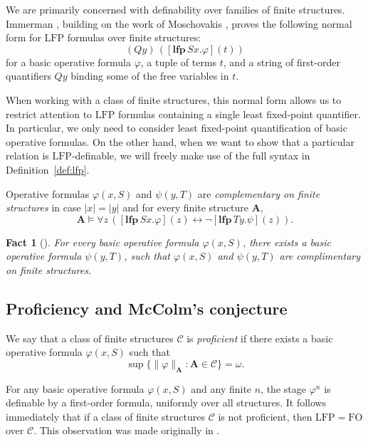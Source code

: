 \documentclass{lmcs}
\newcommand{\LFP}{\mathrm{LFP}}
\newcommand{\FO}{\mathrm{FO}}
\newcommand{\A}{\mathbf{A}}
\theoremstyle{thmC}
\newtheorem{factC}[thm]{Fact}
\begin{document}
\begin{rem}\label{rem:normalform}
We are primarily concerned with definability over families of finite structures. Immerman \cite{I}, building on the work of Moschovakis \cite{Mos}, proves the following normal form for $\LFP$ formulas over finite structures: \[(Qy)\,([\mathbf{lfp}\,Sx.\varphi](t))\] for a basic operative formula $\varphi$, a tuple of terms $t$, and a string of first-order quantifiers $Qy$ binding some of the free variables in $t$.

When working with a class of finite structures, this normal form allows us to restrict attention to $\LFP$ formulas containing a single least fixed-point quantifier. In particular, we only need to consider least fixed-point quantification of basic operative formulas. On the other hand, when we want to show that a particular relation is $\LFP$-definable, we will freely make use of the full syntax in Definition~\ref{def:lfp}.
\end{rem}

\begin{defi}
Operative formulas $\varphi(x,S)$ and $\psi(y,T)$ are \emph{complementary on finite structures} in case $|x| = |y|$ and for every finite structure $\A$, \[\A \models \forall z\, \left([\mathbf{lfp}\,Sx.\varphi](z)\leftrightarrow \lnot [\mathbf{lfp}\,Ty.\psi](z)\right).\]
\end{defi}

\begin{factC}[\cite{I}]
For every basic operative formula $\varphi(x,S)$, there exists a basic operative formula $\psi(y,T)$, such that $\varphi(x,S)$ and $\psi(y,T)$ are complimentary on finite structures.
\end{factC}


\subsection{Proficiency and McColm's conjecture}

\begin{defi}
We say that a class of finite structures $\mathcal{C}$ is \emph{proficient} if there exists a basic operative formula $\varphi(x,S)$ such that
\[ \sup \{ \| \varphi \|_\A : \A \in \mathcal{C} \} = \omega. \]
\end{defi}

\begin{rem}
\label{LFP=FO} For any basic operative formula $\varphi(x,S)$ and any finite $n$, the stage $\varphi^n$ is definable by a first-order formula, uniformly over all structures. It follows immediately that if a class of finite structures $\mathcal{C}$ is not proficient, then $\LFP = \FO$ over $\mathcal{C}$. This observation was made originally in
\cite{McC}.
\end{rem}
\end{document}
